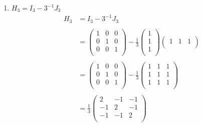 \documentclass[11pt,a4paper]{article}
\theoremstyle{definition}
\begin{document}
\begin{enumerate}
\begin{align*}
\begin{vmatrix}
3 & -40 & 2 & -5\\
1 & -56 & 4 & -7\\
0 & 0 & 1 & -1\\
0 & 0 & 1 & 0\\
\end{vmatrix}\\\\
& = \begin{vmatrix}
3 & -40\\
1 & -56\\
\end{vmatrix}
\begin{vmatrix}
1 & -1\\
1 & 0\\
\end{vmatrix}\\\\
& = (-168 + 40) (0+1)\\
& = -128\\
\end{align*}

\item $H_3 = I_3 -3^{-1}J_3$
\begin{align*}
H_3 & = I_3 - 3^{-1} J_3\\\\
& = \begin{pmatrix}
1 & 0 & 0\\
0 & 1 & 0\\
0 & 0 & 1\\
\end{pmatrix}-\frac{1}{3}\begin{pmatrix}
1\\
1\\
1\\
\end{pmatrix}\begin{pmatrix}
1 & 1 & 1\\
\end{pmatrix}\\\\
& = \begin{pmatrix}
1 & 0 & 0\\
0 & 1 & 0\\
0 & 0 & 1\\
\end{pmatrix}-\frac{1}{3}\begin{pmatrix}
1 & 1 & 1\\
1 & 1 & 1\\
1 & 1 & 1\\
\end{pmatrix}\\\\
& = \frac{1}{3}\begin{pmatrix}
2 & -1 & -1\\
-1 & 2 & -1\\
-1 & -1 & 2\\
\end{pmatrix}\\\\
\end{align*}
\end{enumerate}
\end{document}

